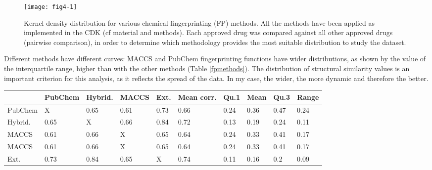 \begin{figure}[H]
    \centering
    \texttt{[image: fig4-1]}
    \caption{Kernel density distribution for various chemical fingerprinting (FP) methods. All the methods have been applied as implemented in the CDK (cf material and methods). Each approved drug was compared against all other approved drugs (pairwise comparison), in order to determine which methodology provides the most suitable distribution to study the dataset.}
    \label{fig4-1}
\end{figure}

Different methods have different curves: MACCS and PubChem fingerprinting functions have wider distributions, as shown by the value of the interquartile range, higher than with the other methods (Table \ref{fpmethods}). The distribution of structural similarity values is an important criterion for this analysis, as it reflects the spread of the data. In my case, the wider, the more dynamic and therefore the better.

\begin{center}
\small
    \begin{tabular}{| l | l | l | l | l | l || l | l | l | l |}
    \hline
 & PubChem & Hybrid. & MACCS & Ext. & Mean corr. & Qu.1 & Mean & Qu.3 & Range \\ \hline \hline 
PubChem & X & 0.65 & 0.61 & 0.73 & 0.66 & 0.24 & 0.36 & 0.47 & 0.24 \\ \hline
Hybrid. & 0.65 & X & 0.66 & 0.84 & 0.72 & 0.13 & 0.19 & 0.24 & 0.11 \\ \hline
MACCS & 0.61 & 0.66 & X & 0.65 & 0.64 & 0.24 & 0.33 & 0.41 & 0.17 \\ \hline
MACCS & 0.61 & 0.66 & X & 0.65 & 0.64 & 0.24 & 0.33 & 0.41 & 0.17 \\ \hline
Ext. & 0.73 & 0.84 & 0.65 & X & 0.74 & 0.11 & 0.16 & 0.2 & 0.09 \\ \hline
    \end{tabular} 
    \label{fpmethods}
\end{center}

